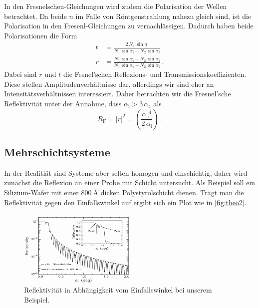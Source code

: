In den Fresnelschen-Gleichungen wird zudem die Polarisation der Wellen betrachtet.
Da beide $n$ im Falle von Röntgenstrahlung nahezu gleich sind, ist die Polarisation in den Fresenl-Gleichungen zu vernachlässigen.
Dadurch haben beide Polarisationen die Form
\begin{align}
    t &= \frac{2 \, N_1 \, \sin{\alpha _\text{i}} }{N_1 \, \sin{\alpha _\text{i}} + N_2 \, \sin{\alpha _\text{t}}} \\
    r &= \frac{N_1 \, \sin{\alpha _\text{i}} - N_2 \, \sin{\alpha _\text{t}}}{N_1 \, \sin{\alpha _\text{i}} + N_2 \, \sin{\alpha _\text{t}}} \,.
\end{align}
Dabei sind $r$ und $t$ die Fesnel'schen Reflexions- und Transmissionskoeffizienten. 
Diese stellen Amplitudenverhältnisse dar, allerdings wir sind eher an Intensitätsverhältnissen interessiert.
Daher betrachten wir die Fresnel'sche Reflektivität unter der Annahme, dass $\alpha _\text{i} > 3 \, \alpha _\text{c}$ als 
\begin{equation}
    R_\text{F} = |r|^2 = \left( \frac{{\alpha _\text{c}}^4}{2 \, \alpha _\text{i}}  \right) \,.
    \label{eq:reflek}
\end{equation}

\subsection{Mehrschichtsysteme}
\label{theo2}

In der Realitiät sind Systeme aber selten homogen und einschichtig, daher wird zunächst die Reflexion an einer Probe mit Schicht untersucht.
Als Beispiel soll ein Silizium-Wafer mit einer $\SI{800}{\angstrom}$ dicken Polystyrolschicht dienen. 
Trägt man die Reflektivität gegen den Einfallswinkel auf ergibt sich ein Plot wie in \autoref{fig:theo2}.

\begin{figure}
    \centering
    \includegraphics[width=0.5\textwidth]{images/plot.png}
    \caption{Reflektivität in Abhängigkeit vom Einfallswinkel bei unserem Beispiel. \cite{V44-old}}
    \label{fig:theo2}
\end{figure}


